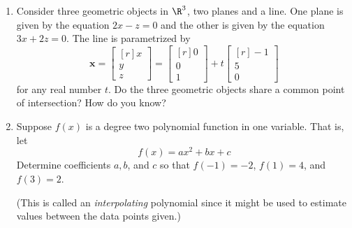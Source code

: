 \documentclass[basic]{inVerba-notes}
\begin{document}
\begin{enumerate}[align=left, leftmargin=0pt, labelindent=\parindent, listparindent=\parindent, labelwidth=0pt, itemindent=!]
\begin{enumerate}
      
    \end{enumerate}

    \newpage

    \item {} Consider three geometric objects in \(\R^3\), two planes and a line. One plane is given by the equation \(2x-z=0\) and the other is given by the equation \(3x+2z=0\). The line is parametrized by
    \[\bm{x}=\begin{bmatrix*}[r] x \\ y \\ z \end{bmatrix*} = \begin{bmatrix*}[r] 0 \\ 0 \\ 1 \end{bmatrix*} + t \begin{bmatrix*}[r] -1 \\ 5 \\ 0 \end{bmatrix*}
    \]
    for any real number \(t\). Do the three geometric objects share a common point of intersection? How do you know?
    
    \newpage

    \item {} Suppose \(f(x)\) is a degree two polynomial function in one variable. That is, let 
    \[ f(x)=ax^2+bx+c\]
    Determine coefficients \(a, b\), and \(c\) so that \(f(-1)=-2\), \(f(1)=4\), and \(f(3)=2\). \par (This is called an \textit{interpolating} polynomial since it might be used to estimate values between the data points given.) \par


\end{enumerate}
\end{document}
